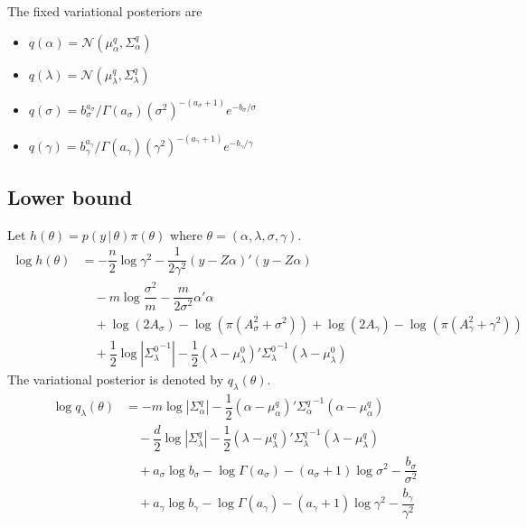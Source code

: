 \documentclass[12pt]{article}
\begin{document}
  The fixed variational posteriors are
  \begin{itemize}
    \item $q(\alpha)=\mathcal{N}\left(\mu_{\alpha}^{q},\Sigma_{\alpha}^{q}\right)$
    \item $q(\lambda)=\mathcal{N}\left(\mu_{\lambda}^{q},\Sigma_{\lambda}^{q}\right)$
    \item $q(\sigma) = b_{\sigma}^{a_{\sigma}}/\Gamma\left(a_{\sigma}\right) \left(\sigma^{2}\right)^{-(a_{\sigma}+1)}e^{-b_{\sigma}/\sigma}$
    \item $q(\gamma) = b_{\gamma}^{a_{\gamma}}/\Gamma\left(a_{\gamma}\right) \left(\gamma^{2}\right)^{-(a_{\gamma}+1)}e^{-b_{\gamma}/\gamma}$
  \end{itemize}
\subsection{Lower bound}
Let $h(\theta) = p(y\,|\,\theta)\pi(\theta)$ where $\theta = (\alpha,\lambda,\sigma,\gamma)$.
\begin{align}
  \log h(\theta) &= -\dfrac{n}{2}\log \gamma^{2}-\dfrac{1}{2\gamma^{2}}\left(y-Z\alpha\right)'\left(y-Z\alpha\right)\\
  &\quad -m\log\dfrac{\sigma^{2}}{m}-\dfrac{m}{2\sigma^{2}}\alpha'\alpha\\
  &\quad +\log(2A_{\sigma})-\log\left(\pi\left(A_{\sigma}^{2}+\sigma^{2}\right)\right)+\log\left(2A_{\gamma}\right)-\log\left(\pi\left(A_{\gamma}^{2}+\gamma^{2}\right)\right)\\
  &\quad +\dfrac{1}{2}\log\left|{\Sigma_{\lambda}^{0}}^{-1}\right|-\dfrac{1}{2}\left(\lambda-\mu_{\lambda}^{0}\right)'{\Sigma_{\lambda}^{0}}^{-1}\left(\lambda-\mu_{\lambda}^{0}\right)
\end{align}
The variational posterior is denoted by $q_{\lambda}(\theta)$.
\begin{align}
  \log q_{\lambda}(\theta) &= -m\log\left|\Sigma_{\alpha}^{q}\right|-\dfrac{1}{2}\left(\alpha-\mu_{\alpha}^{q}\right)'{\Sigma_{\alpha}^{q}}^{-1}\left(\alpha-\mu_{\alpha}^{q}\right)\\
  &\quad -\dfrac{d}{2}\log\left|\Sigma_{\lambda}^{q}\right|-\dfrac{1}{2}\left(\lambda-\mu_{\lambda}^{q}\right)'{\Sigma_{\lambda}^{q}}^{-1}\left(\lambda-\mu_{\lambda}^{q}\right)\\
  &\quad +a_{\sigma}\log b_{\sigma}-\log\Gamma\left(a_{\sigma}\right)-\left(a_{\sigma}+1\right)\log \sigma^{2}-\dfrac{b_{\sigma}}{\sigma^{2}}\\
  &\quad +a_{\gamma}\log b_{\gamma}-\log\Gamma\left(a_{\gamma}\right)-\left(a_{\gamma}+1\right)\log \gamma^{2}-\dfrac{b_{\gamma}}{\gamma^{2}}
\end{align}
\end{document}
